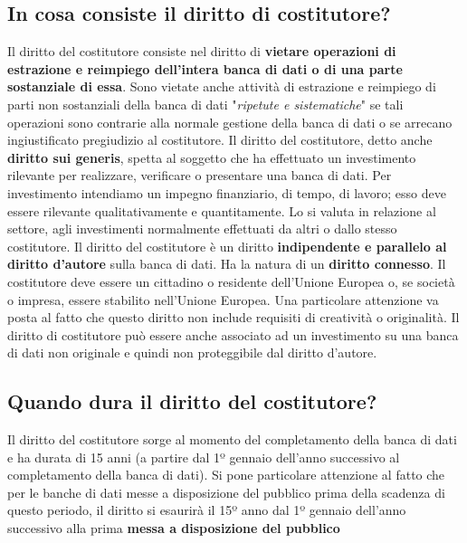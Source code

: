 \subsection{In cosa consiste il diritto di costitutore?}
Il diritto del costitutore consiste nel diritto di \textbf{vietare operazioni di estrazione e reimpiego dell'intera banca di dati
o di una parte sostanziale di essa}.\newline
Sono vietate anche attività di estrazione e reimpiego di parti non sostanziali della banca di dati
"\emph{ripetute e sistematiche}" se
tali operazioni sono contrarie alla normale gestione della banca di dati o se arrecano ingiustificato pregiudizio al
costitutore.\newline
Il diritto del costitutore, detto anche \textbf{diritto sui generis}, spetta al soggetto che ha effettuato un
investimento rilevante per realizzare, verificare o presentare una banca di dati.\newline
Per investimento intendiamo un impegno finanziario, di tempo, di lavoro; esso deve essere rilevante
qualitativamente e quantitamente. Lo si valuta in relazione al settore, agli investimenti normalmente effettuati
da altri o dallo stesso costitutore.\newline
Il diritto del costitutore è un diritto \textbf{indipendente e parallelo al diritto d'autore} sulla banca di dati. Ha la natura di un \textbf{diritto connesso}.\newline
Il costitutore deve essere un cittadino o residente dell'Unione Europea o, se società o impresa, essere
stabilito nell'Unione Europea.\newline
Una particolare attenzione va posta al fatto che questo diritto non include requisiti di creatività o originalità.
Il diritto di costitutore può essere anche associato ad un investimento su una banca di dati non originale e quindi non
proteggibile dal diritto d'autore.\newline

\subsection{Quando dura il diritto del costitutore?}
Il diritto del costitutore sorge al momento del completamento della banca di dati e ha durata di 15 anni
(a partire dal 1º gennaio dell'anno successivo al completamento della banca di dati).\newline
Si pone particolare attenzione al fatto che per le banche di dati messe a disposizione del pubblico prima della
scadenza di questo periodo, il diritto si esaurirà il 15º anno dal 1º gennaio dell'anno
successivo alla prima \textbf{messa a disposizione del pubblico}

